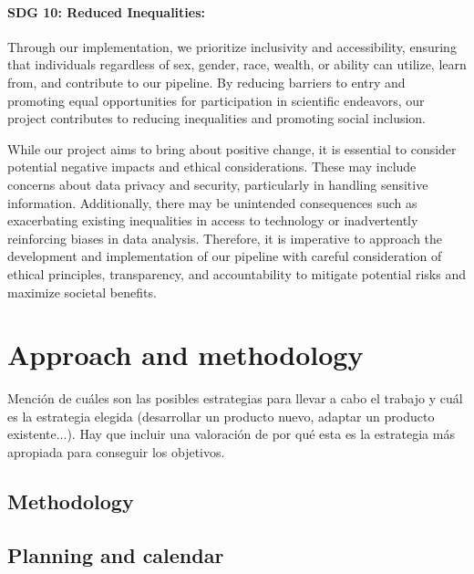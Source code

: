 \documentclass[ENG, BIB]{TFUOC}%
\begin{document}
\subsubsection{SDG 10: Reduced Inequalities:} 

Through our implementation, we prioritize inclusivity and accessibility, ensuring that individuals regardless of sex, gender, race, wealth, or ability can utilize, learn from, and contribute to our pipeline. By reducing barriers to entry and promoting equal opportunities for participation in scientific endeavors, our project contributes to reducing inequalities and promoting social inclusion. 

\vspace{18pt}

While our project aims to bring about positive change, it is essential to consider potential negative impacts and ethical considerations. These may include concerns about data privacy and security, particularly in handling sensitive information. Additionally, there may be unintended consequences such as exacerbating existing inequalities in access to technology or inadvertently reinforcing biases in data analysis. Therefore, it is imperative to approach the development and implementation of our pipeline with careful consideration of ethical principles, transparency, and accountability to mitigate potential risks and maximize societal benefits.

\chapter{Approach and methodology}

Mención de cuáles son las posibles estrategias para llevar a cabo el trabajo y cuál es la estrategia elegida (desarrollar un producto nuevo, adaptar un producto existente...). Hay que incluir una valoración de por qué esta es la estrategia más apropiada para conseguir los objetivos.   	

\section{Methodology}


\section{Planning and calendar}
\end{document}
